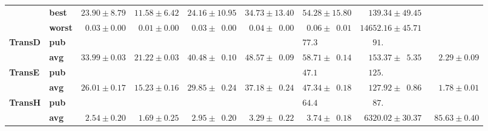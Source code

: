 \begin{tabular}{llrrrrrrr}
       & \textbf{best} &            $23.90 \pm 8.79$ &            $11.58 \pm 6.42$ &                      $24.16 \pm 10.95$ &                      $34.73 \pm 13.40$ &                      $54.28 \pm 15.80$ &            $\phantom{00}139.34 \pm 49.45$ &                              \\
       & \textbf{worst} &  $\phantom{0}0.03 \pm 0.00$ &  $\phantom{0}0.01 \pm 0.00$ &  $\phantom{0}0.03 \pm \phantom{0}0.00$ &  $\phantom{0}0.04 \pm \phantom{0}0.00$ &  $\phantom{0}0.06 \pm \phantom{0}0.01$ &                      $14652.16 \pm 45.71$ &                              \\\midrule
\textbf{TransD} & \textbf{pub} &                             &                             &                                        &                                        &            $77.3\phantom{0 \pm 00.00}$ &  $\phantom{000}91.\phantom{00 \pm 00.00}$ &                              \\
       & \textbf{avg} &            $33.99 \pm 0.03$ &            $21.22 \pm 0.03$ &            $40.48 \pm \phantom{0}0.10$ &            $48.57 \pm \phantom{0}0.09$ &            $58.71 \pm \phantom{0}0.14$ &  $\phantom{00}153.37 \pm \phantom{0}5.35$ &  $\phantom{00}2.29 \pm 0.09$ \\\midrule
\textbf{TransE} & \textbf{pub} &                             &                             &                                        &                                        &            $47.1\phantom{0 \pm 00.00}$ &  $\phantom{00}125.\phantom{00 \pm 00.00}$ &                              \\
       & \textbf{avg} &            $26.01 \pm 0.17$ &            $15.23 \pm 0.16$ &            $29.85 \pm \phantom{0}0.24$ &            $37.18 \pm \phantom{0}0.24$ &            $47.34 \pm \phantom{0}0.18$ &  $\phantom{00}127.92 \pm \phantom{0}0.86$ &  $\phantom{00}1.78 \pm 0.01$ \\\midrule
\textbf{TransH} & \textbf{pub} &                             &                             &                                        &                                        &            $64.4\phantom{0 \pm 00.00}$ &  $\phantom{000}87.\phantom{00 \pm 00.00}$ &                              \\
       & \textbf{avg} &  $\phantom{0}2.54 \pm 0.20$ &  $\phantom{0}1.69 \pm 0.25$ &  $\phantom{0}2.95 \pm \phantom{0}0.20$ &  $\phantom{0}3.29 \pm \phantom{0}0.22$ &  $\phantom{0}3.74 \pm \phantom{0}0.18$ &            $\phantom{0}6320.02 \pm 30.37$ &  $\phantom{0}85.63 \pm 0.40$ \\

\end{tabular}
